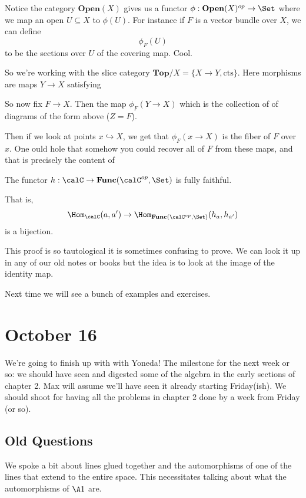 \documentclass[12pt]{article}
\begin{document}
Notice the category $\mathbf{Open}(X)$ gives us a functor $\phi:\mathbf{Open}(X)^{op}\to\Set$ where we map 
an open $U\subseteq X$ to $\phi(U)$. For instance if $F$ is a vector bundle over $X$, we can define
\[\phi_F(U)\]
to be the sections over $U$ of the covering map. Cool.

So we're working with the slice category $\mathbf{Top}/X=\{X\to Y,\text{cts}\}$. Here morphisms are maps $Y\to X$ satisfying 
\begin{center}
\end{center}

So now fix $F\to X$. Then the map $\phi_F(Y\to X)$ which is the collection of of diagrams of the form above ($Z=F$).

Then if we look at points $x\hookrightarrow X$, we get that $\phi_F(x\to X)$ is the fiber of $F$ over $x$. One ould hole that somehow 
you could recover all of $F$ from these maps, and that is precisely the content of 
\begin{lem}[Yoneda]
	The functor $h:\calC\to\mathbf{Func}(\calC^{op},\Set)$ is fully faithful.
\end{lem}
\begin{rmk}
	That is, 
	\[\Hom_\calC(a,a')\to\Hom_{\mathbf{Func}(\calC^{op},\Set)}(h_a,h_{a'})\]
	is a bijection.
\end{rmk}
\begin{prf}
	This proof is so tautological it is sometimes confusing to prove. We can look it up in any of our old notes or books but the idea is 
	to look at the image of the identity map.
\end{prf}
Next time we will see a bunch of examples and exercises.

\section{October 16}
We're going to finish up with with Yoneda! The milestone for the next week or so: we should have seen and digested some of the 
algebra in the early sections of chapter 2. Max will assume we'll have seen it already starting Friday(ish). We should shoot for having all the problems 
in chapter 2 done by a week from Friday (or so).

\subsection{Old Questions} 
We spoke a bit about lines glued together and the automorphisms of one of the lines that extend to the entire space. 
This necessitates talking about what the automorphisms of $\A1$ are.
\end{document}
